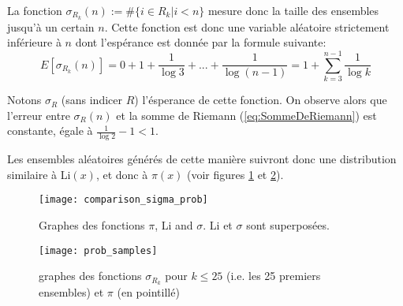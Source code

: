 \documentclass[../main.tex]{report}
\begin{document}
La fonction $\sigma_{R_k}(n) := \# \{i \in R_{k} | i < n\}$ mesure donc la taille des ensembles jusqu'à un certain $n$. 
Cette fonction est donc une variable aléatoire strictement inférieure à $n$ dont l'espérance est donnée par la formule suivante:
\begin{equation}
\label{eq:esperance}
E[\sigma_{R_k}(n)] = 0 + 1 + \frac{1}{\log 3} + ... + \frac{1}{\log (n-1)}
= 1 + \sum_{k=3}^{n-1} \frac{1}{\log k}
\end{equation}

Notons $\sigma_R$ (sans indicer $R$) l'ésperance de cette fonction.
On observe alors que l'erreur entre $\sigma_R(n)$ et la somme de Riemann (\ref{eq:SommeDeRiemann}) est constante, égale à
$\frac{1}{\log 2}- 1 < 1$.

Les ensembles aléatoires générés de cette manière suivront donc une distribution similaire à Li$(x)$, et donc à $\pi(x)$
(voir figures \ref{fig:comparison_sigma_prob} et \ref{fig:prob_sample}).

\begin{figure}[H]
\texttt{[image: comparison\_sigma\_prob]}

\caption{Graphes des fonctions $\pi$, Li and $\sigma$. Li et $\sigma$ sont superposées.}
\label{fig:comparison_sigma_prob}
\end{figure}

\begin{figure}[H]
	\centering
	\texttt{[image: prob\_samples]}
	\caption{graphes des fonctions $\sigma_{R_k}$ pour $k \leq 25$ (i.e. les 25 premiers ensembles) et $\pi$ (en pointillé)}
	\label{fig:prob_sample}
\end{figure}
\end{document}
